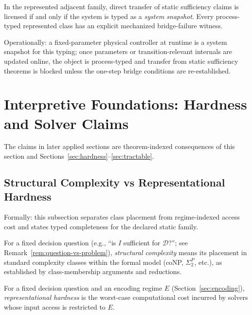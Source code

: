 \begin{proposition}\label{prop:snapshot-process-typing}
In the represented adjacent family, direct transfer of static sufficiency claims is licensed if and only if the system is typed as a \emph{system snapshot}. Every process-typed represented class has an explicit mechanized bridge-failure witness.
\end{proposition}

Operationally: a fixed-parameter physical controller at runtime is a system snapshot for this typing; once parameters or transition-relevant internals are updated online, the object is process-typed and transfer from static sufficiency theorems is blocked unless the one-step bridge conditions are re-established.

\section{Interpretive Foundations: Hardness and Solver Claims}\label{sec:interpretive-foundations}

The claims in later applied sections are theorem-indexed consequences of this section and Sections~\ref{sec:hardness}--\ref{sec:tractable}.

\subsection{Structural Complexity vs Representational Hardness}

Formally: this subsection separates class placement from regime-indexed access cost and states typed completeness for the declared static family.

\begin{definition}\label{def:structural-complexity}
For a fixed decision question (e.g., ``is $I$ sufficient for $\mathcal{D}$?''; see Remark~\ref{rem:question-vs-problem}), \emph{structural complexity} means its placement in standard complexity classes within the formal model (coNP, $\Sigma_2^P$, etc.), as established by class-membership arguments and reductions.
\end{definition}

\begin{definition}\label{def:representational-hardness}
For a fixed decision question and an encoding regime $E$ (Section~\ref{sec:encoding}), \emph{representational hardness} is the worst-case computational cost incurred by solvers whose input access is restricted to $E$.
\end{definition}

